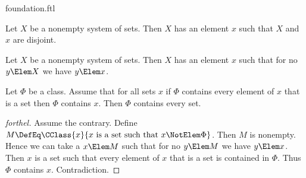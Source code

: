 \documentclass{stex}
\begin{document}
\begin{smodule}{foundation.ftl}



\begin{axiom*}[forthel,title=Foundation,name=Foundation Axiom]
  Let $X$ be a nonempty system of sets.
  Then $X$ has an element $x$ such that $X$ and $x$ are disjoint.
\end{axiom*}

\begin{proposition*}[forthel,name=wellfoundedness of membership relation]
  Let $X$ be a nonempty system of sets.
  Then $X$ has an element $x$ such that for no $y \Elem X$ we have $y \Elem x$.
\end{proposition*}

\begin{proposition*}[forthel,name=epsilon induction]
  Let $\Phi$ be a class.
  Assume that for all sets $x$ if $\Phi$ contains every element of $x$ that is a set then $\Phi$ contains $x$.
  Then $\Phi$ contains every set.
\end{proposition*}
\begin{proof}[forthel]
  Assume the contrary.
  Define $M \DefEq \CClass{x}{x\text{ is a set such that }x \NotElem \Phi}$.
  Then $M$ is nonempty.
  Hence we can take a $x \Elem M$ such that for no $y \Elem M$ we have $y \Elem x$.
  Then $x$ is a set such that every element of $x$ that is a set is contained in $\Phi$.
  Thus $\Phi$ contains $x$.
  Contradiction.
\end{proof}

\end{smodule}
\end{document}
